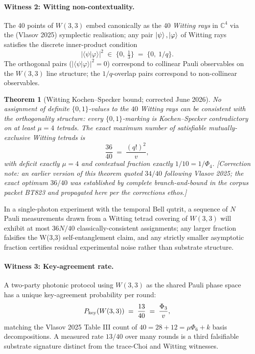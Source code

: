 ﻿\documentclass[12pt]{article}
\newtheorem{theorem}{Theorem}[section]
\newcommand{\CC}{\mathbb{C}}
\begin{document}
\paragraph{Witness 2: Witting non-contextuality.}
The 40 points of $W(3,3)$ embed canonically as the 40 \emph{Witting rays}
in $\CC^4$ via the (Vlasov 2025) symplectic realisation; any pair
$\ket{\psi},\ket{\varphi}$ of Witting rays satisfies the discrete inner-product
condition
\begin{equation}
  |\langle\psi | \varphi\rangle|^2 \;\in\; \{0,\ \tfrac{1}{3}\}
  \;=\; \{0,\ 1/q\}.
  \label{eq:witting_overlap}
\end{equation}
The orthogonal pairs ($|\langle\psi|\varphi\rangle|^2 = 0$) correspond to
collinear Pauli observables on the $W(3,3)$ line structure; the
$1/q$-overlap pairs correspond to non-collinear observables.

\begin{theorem}[Witting Kochen--Specker bound; corrected June 2026]\label{thm:KSbound}
No assignment of definite $\{0,1\}$-values to the $40$ Witting rays can be
consistent with the orthogonality structure: every $\{0,1\}$-marking is
\emph{Kochen--Specker contradictory} on at least $\mu = 4$ tetrads.  The
exact maximum number of \emph{satisfiable} mutually-exclusive Witting
tetrads is
\begin{equation}
  \frac{36}{40} \;=\; \frac{(q!)^2}{v},
\end{equation}
with deficit exactly $\mu = 4$ and contextual fraction exactly
$1/10 = 1/\Phi_4$.  [Correction note: an earlier version of this theorem
quoted $34/40$ following Vlasov 2025; the exact optimum $36/40$ was
established by complete branch-and-bound in the corpus packet BT823 and
propagated here per the corrections ethos.]
\end{theorem}

In a single-photon experiment with the temporal Bell qutrit, a sequence of
$N$ Pauli measurements drawn from a Witting tetrad covering of $W(3,3)$
will exhibit at most $36N/40$ classically-consistent assignments;
any larger fraction falsifies the W(3,3) self-entanglement claim, and any
strictly smaller asymptotic fraction certifies residual experimental
noise rather than substrate structure.

\paragraph{Witness 3: Key-agreement rate.}
A two-party photonic protocol using $W(3,3)$ as the shared Pauli phase space
has a unique key-agreement probability per round:
\begin{equation}
  P_{\rm key}(W(3,3)) \;=\; \frac{13}{40} \;=\; \frac{\Phi_3}{v},
  \label{eq:keyrate}
\end{equation}
matching the Vlasov 2025 Table III count of $40 = 28 + 12 = \mu\Phi_6 + k$
basis decompositions.  A measured rate $13/40$ over many rounds is a third
falsifiable substrate signature distinct from the trace-Choi and Witting
witnesses.
\end{document}
